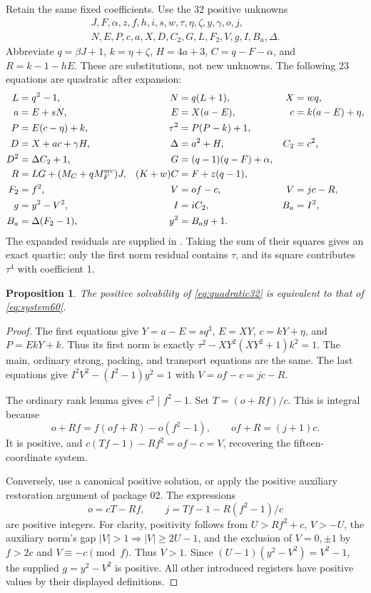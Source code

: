 \documentclass[11pt,a4paper]{article}
\newtheorem{proposition}[theorem]{Proposition}
\theoremstyle{definition}\newtheorem{definition}[theorem]{Definition}
\theoremstyle{remark}\newtheorem{remark}[theorem]{Remark}
\newcommand{\code}[1]{\texttt{\detokenize{#1}}}
\newcommand{\MF}{M_F^{\mathrm{src}}}
\begin{document}
Retain the same fixed coefficients. Use the 32 positive unknowns
\begin{gather*}
 J,F,\alpha,z,f,h,i,s,w,\tau,\eta,\zeta,y,\gamma,o,j,\\
 N,E,P,c,a,X,D,C_2,G,L,F_2,V,g,I,B_a,\Delta.
\end{gather*}
Abbreviate \(q=\beta J+1\), \(k=\eta+\zeta\), \(H=4a+3\),
\(C=q-F-\alpha\), and \(R=k-1-hE\). These are substitutions, not
new unknowns. The following 23 equations are quadratic after expansion:
\begin{align}
 L&=q^2-1,& N&=q(L+1),&X&=wq,\notag\\
 a&=E+sN,&E&=X(a-E),&c&=k(a-E)+\eta,\notag\\
 P&=E(c-\eta)+k,&\tau^2&=P(P-k)+1,\notag\\
 D&=X+ac+\gamma H,&\Delta&=a^2+H,&C_2&=c^2,\notag\\
 D^2&=\Delta C_2+1,&G&=(q-1)(q-F)+\alpha,\notag\\
 R&=LG+(M_C+q\MF)J,&(K+w)C&=F+z(q-1),\notag\\
 F_2&=f^2,&V&=of-c,&V&=jc-R,\notag\\
 g&=y^2-V^2,&I&=iC_2,&B_a&=I^2,\notag\\
 B_a&=\Delta(F_2-1),&y^2&=B_ag+1.
 \label{eq:quadratic32}
\end{align}
The expanded residuals are supplied in \code{quadratic/quartic32.json}.
Taking the sum of their squares gives an exact quartic: only the first
norm residual contains \(\tau\), and its square contributes
\(\tau^4\) with coefficient 1.

\begin{proposition}
The positive solvability of \eqref{eq:quadratic32} is equivalent to
that of \eqref{eq:system60}.
\end{proposition}
\begin{proof}
The first equations give \(Y=a-E=sq^3\), \(E=XY\),
\(c=kY+\eta\), and \(P=EkY+k\). Thus its first norm is exactly
\(\tau^2-XY^2(XY^2+1)k^2=1\). The main, ordinary strong, packing,
and transport equations are the same. The last equations give
\(I^2V^2-(I^2-1)y^2=1\) with \(V=of-c=jc-R\).

The ordinary rank lemma gives \(c^2\mid f^2-1\). Set
\(T=(o+Rf)/c\). This is integral because
\[
 o+Rf=f(of+R)-o(f^2-1),\qquad of+R=(j+1)c.
\]
It is positive, and \(c(Tf-1)-Rf^2=of-c=V\), recovering the
fifteen-coordinate system.

Conversely, use a canonical positive solution, or apply the positive
auxiliary restoration argument of package 02. The expressions
\[
 o=cT-Rf,\qquad j=Tf-1-R(f^2-1)/c
\]
are positive integers. For clarity, positivity follows from
\(U>Rf^2+c\), \(V>-U\), the auxiliary norm's gap
\(|V|>1\Rightarrow |V|\ge2U-1\), and the exclusion of
\(V=0,\pm1\) by \(f>2c\) and \(V\equiv-c\pmod f\).
Thus \(V>1\). Since \((U-1)(y^2-V^2)=V^2-1\), the supplied
\(g=y^2-V^2\) is positive. All other introduced registers have
positive values by their displayed definitions.
\end{proof}
\end{document}
